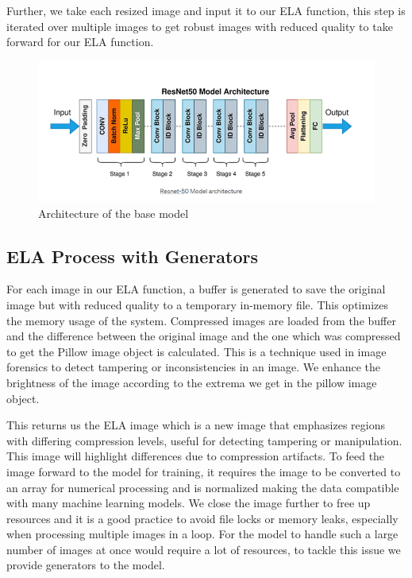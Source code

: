 \documentclass{ieeeaccess}
\begin{document}
Further, we take each resized image and input it to our ELA function, this step is iterated over multiple images to get robust images with reduced quality to take forward for our ELA function.

\begin{figure}
	\centering
	\includegraphics[width=\linewidth]{Base_Model.png}
	\caption{ Architecture of the base model}
	\label{base-model}
\end{figure} 

\subsection{ELA Process with Generators}
For each image in our ELA function, a buffer is generated to save the original image but with reduced quality to a temporary in-memory file. This optimizes the memory usage of the system. Compressed images are loaded from the buffer and the difference between the original image and the one which was compressed to get the Pillow image object is calculated. This is a technique used in image forensics to detect tampering or inconsistencies in an image. We enhance the brightness of the image according to the extrema we get in the pillow image object. 

This returns us the ELA image which is a new image that emphasizes regions with differing compression levels, useful for detecting tampering or manipulation. This image will highlight differences due to compression artifacts. To feed the image forward to the model for training, it requires the image to be converted to an array for numerical processing and is normalized making the data compatible with many machine learning models. We close the image further to free up resources and it is a good practice to avoid file locks or memory leaks, especially when processing multiple images in a loop. For the model to handle such a large number of images at once would require a lot of resources, to tackle this issue we provide generators to the model.
\end{document}
